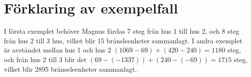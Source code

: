 \section*{Förklaring av exempelfall}
I första exemplet behöver Magnus färdas 7 steg från hus 1 till hus 2, och 8 steg från hus 2 till 3 hus, vilket blir 15 bränsleenheter sammanlagt.
I andra exemplet är avståndet mellan hus 1 och hus 2 $(1069-69)+(420-240)=1180$ steg, och från hus 2 till 3 blir det $(69-(-1337))+(240-(-69))=1715$ steg, vilket blir 2895 bränseleenheter sammanlagt.